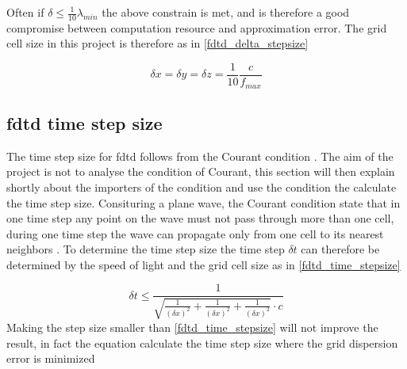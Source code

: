 Often if $ \delta \leq \frac{1}{10}\lambda_{min}$ the above constrain is met, and is therefore a good compromise between computation resource and approximation error. The grid cell size in this project is therefore as in \autoref{fdtd_delta_stepsize}

\begin{equation}\label{fdtd_delta_stepsize}
\delta x = \delta y = \delta z = \frac{1}{10} \frac{c}{f_{max}}
\end{equation}

    \startexplain
    \stopexplain
    
    
\subsection{\gls{fdtd} time step size}    
The time step size for \gls{fdtd} follows from the Courant condition \citep{Kunz1993}. The aim of the project is not to analyse the condition of Courant, this section will then explain shortly about the importers of the condition and use the condition the calculate the time step size. Consituring a plane wave, the Courant condition state that in one time step any point on the wave must not pass through more than one cell, during one time step the wave can propagate only from one cell to its nearest neighbors \citep{Kunz1993}. To determine the time step size the time step $\delta t $ can therefore be determined by the speed of light and the grid cell size as in \autoref{fdtd_time_stepsize}



\begin{equation}\label{fdtd_time_stepsize}
\delta t \leq \frac{1}{\sqrt{\frac{1}{(\delta x)^2}+\frac{1}{(\delta x)^2}+\frac{1}{(\delta x)^2} }\cdot c}
\end{equation}
        \startexplain
    \stopexplain
Making the step size smaller than \autoref{fdtd_time_stepsize} will not improve the result, in fact the equation calculate the time step size where the grid dispersion error is minimized \citep{Kunz1993}
    
